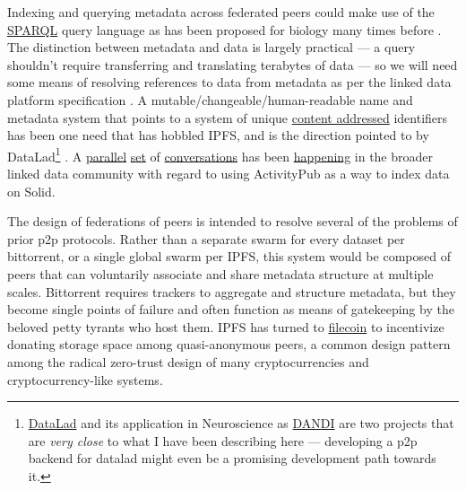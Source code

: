 Indexing and querying metadata across federated peers could make use of
the \href{https://www.w3.org/TR/sparql11-federated-query/}{SPARQL} query
language \citep{SPARQLFederatedQuery2013}  as has been proposed
for biology many times before \citep{simaEnablingSemanticQueries2019, djokic-petrovicPIBASFedSPARQLWebbased2017, hasnainBioFedFederatedQuery2017} . The distinction between metadata
and data is largely practical --- a query shouldn't require transferring
and translating terabytes of data --- so we will need some means of
resolving references to data from metadata as per the linked data
platform specification \citep{speicherLinkedDataPlatform2015} . A
mutable/changeable/human-readable name and metadata system that points
to a system of unique
\href{https://en.wikipedia.org/wiki/Content-addressable_storage}{content
addressed} identifiers has been one need that has hobbled IPFS, and is
the direction pointed to by DataLad\footnote{\href{https://www.datalad.org/}{DataLad}
  \citep{halchenkoDataLadDistributedSystem2021, hankeDefenseDecentralizedResearch2021}  and its application in
  Neuroscience as \href{https://dandiarchive.org}{DANDI} are two
  projects that are \emph{very close} to what I have been describing
  here --- developing a p2p backend for datalad might even be a
  promising development path towards it.} \citep{hankeDefenseDecentralizedResearch2021} . A
\href{https://mastodon.social/@humanetech/107155144840782386}{parallel}
\href{https://web.archive.org/web/20211024082055/https://socialhub.activitypub.rocks/t/which-links-between-activitypub-and-solid-project/529}{set}
of
\href{https://web.archive.org/web/20211024080845/https://socialhub.activitypub.rocks/t/how-solid-and-activitypub-complement-each-other-best/727}{conversations}
has been
\href{https://web.archive.org/web/20211024081238/https://forum.solidproject.org/t/discussion-solid-vs-activitypub/2685}{happening}
in the broader linked data community with regard to using ActivityPub as
a way to index data on Solid.

The design of federations of peers is intended to resolve several of the
problems of prior p2p protocols. Rather than a separate swarm for every
dataset per bittorrent, or a single global swarm per IPFS, this system
would be composed of peers that can voluntarily associate and share
metadata structure at multiple scales. Bittorrent requires trackers to
aggregate and structure metadata, but they become single points of
failure and often function as means of gatekeeping by the beloved petty
tyrants who host them. IPFS has turned to
\href{https://filecoin.io/}{filecoin} to incentivize donating storage
space among quasi-anonymous peers, a common design pattern among the
radical zero-trust design of many cryptocurrencies and
cryptocurrency-like systems.

